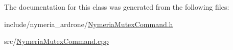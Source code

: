 The documentation for this class was generated from the following files\+:\begin{DoxyCompactItemize}
\item 
include/nymeria\+\_\+ardrone/\hyperlink{_nymeria_mutex_command_8h}{Nymeria\+Mutex\+Command.\+h}\item 
src/\hyperlink{_nymeria_mutex_command_8cpp}{Nymeria\+Mutex\+Command.\+cpp}\end{DoxyCompactItemize}
